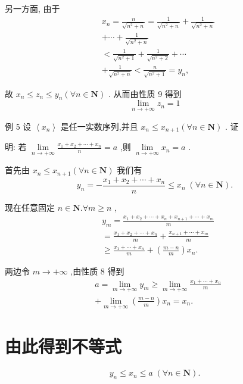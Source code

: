 另一方面, 由于
\begin{align*}
	&{x}_{n} = \frac{n}{\sqrt{{n}^{2} + n}} = \frac{1}{\sqrt{{n}^{2} + n}} + \frac{1}{\sqrt{{n}^{2} + n}}\\
	&+ \cdots  + \frac{1}{\sqrt{{n}^{2} + n}}\\
	&< \frac{1}{\sqrt{{n}^{2} + 1}} + \frac{1}{\sqrt{{n}^{2} + 2}} + \cdots\\
	&+ \frac{1}{\sqrt{{n}^{2} + n}} < \frac{n}{\sqrt{{n}^{2} + 1}} = {y}_{n},
\end{align*}

故 ${x}_{n} \leq  {z}_{n} \leq  {y}_{n}\left( {\forall n \in  \mathbf{N}}\right)$ . 从而由性质 9 得到
$$\mathop{\lim }\limits_{{n \rightarrow   + \infty }}{z}_{n} = 1$$

例 5 设 $\left\langle  {x}_{n}\right\rangle$ 是任一实数序列,并且 ${x}_{n} \leq  {x}_{n + 1}\left( {\forall n \in  \mathbf{N}}\right)$ . 证

明: 若 $\mathop{\lim }\limits_{{n \rightarrow   + \infty }}\frac{{x}_{1} + {x}_{2} + \cdots  + {x}_{n}}{n} = a$ ,则 $\mathop{\lim }\limits_{{n \rightarrow   + \infty }}{x}_{n} = a$ .

首先由 ${x}_{n} \leq  {x}_{n + 1}\left( {\forall n \in  \mathbf{N}}\right)$ 我们有
$${y}_{n} =  - \frac{{x}_{1} + {x}_{2} + \cdots  + {x}_{n}}{n} \leq  {x}_{n}\;\left( {\forall n \in  \mathbf{N}}\right) .$$

现在任意固定 $n \in  \mathbf{N}.\forall m \geq  n$ ,
\begin{align*}
	&{y}_{m} = \frac{{x}_{1} + {x}_{2} + \cdots  + {x}_{n} + {x}_{n + 1} + \cdots  + {x}_{m}}{m}\\
	&= \frac{{x}_{1} + {x}_{2} + \cdots  + {x}_{n}}{m} + \frac{{x}_{n + 1} + \cdots  + {x}_{m}}{m}\\
	&\geq  \frac{{x}_{1} + \cdots  + {x}_{n}}{m} + \left( \frac{m - n}{m}\right) {x}_{n}.
\end{align*}

两边令 $m \rightarrow   + \infty$ ,由性质 8 得到
\begin{align*}
	&a = \mathop{\lim }\limits_{{m \rightarrow   + \infty }}{y}_{m} \geq  \mathop{\lim }\limits_{{m \rightarrow   + \infty }}\frac{{x}_{1} + \cdots  + {x}_{n}}{m}\\
	&+ \mathop{\lim }\limits_{{m \rightarrow   + \infty }}\left( \frac{m - n}{m}\right) {x}_{n} = {x}_{n}.
\end{align*}

\section*{由此得到不等式}
$${y}_{n} \leq  {x}_{n} \leq  a\;\left( {\forall n \in  \mathbf{N}}\right) .$$

